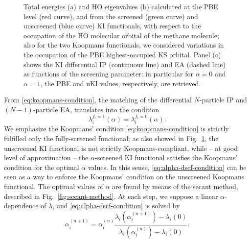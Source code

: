 \begin{figure}
    \centering
    \usebox{\measurebox}
    \begin{minipage}{.48\linewidth}
        \vfill
    \end{minipage}
    \caption[Total energy and $\varepsilon_{\rm HO}$ vs. $f_{\rm HO}$ for $CH_4$ molecule]{Total energies (a) and HO eigenvalues (b) calculated at the PBE level (red curve), and from the screened (green curve) and unscreened (blue curve) KI functionals, with respect to the occupation of the HO molecular orbital of the methane molecule; also for the two Koopmans functionals, we considered variations in the occupation of the PBE highest-occupied KS orbital. Panel (c) shows the KI differential IP (continuous line) and EA (dashed line) as functions of the screening parameter: in particular for $\alpha=0$ and $\alpha=1$, the PBE and uKI values, respectively, are retrieved.}
    \label{fig:pwl-ki-dft}
\end{figure}

From \cref{eq:koopmans-condition}, the matching of the differential $N$-particle IP and $(N-1)$-particle EA, translates into the condition
%
\begin{equation}
    \lambda_i^{f_i=1}(\alpha) = \lambda_i^{f_i=0}(\alpha) .
    \label{eq:alpha-dscf-condition}
\end{equation}
%
We emphasize the Koopmans' condition \eqref{eq:koopmans-condition} is strictly fulfilled only the fully-screened functional; as also showed in Fig.~\ref{fig:pwl-ki-dft}, the unscreened KI functional is not strictly Koopmans-compliant, while -- at good level of approximation -- the $\alpha$-screened KI functional satisfies the Koopmans' condition for the optimal $\alpha$ values. In this sense, \cref{eq:alpha-dscf-condition} can be seen as a way to enforce the Koopmans' condition on the unscreened Koopmans functional. The optimal values of $\alpha$ are found by means of the secant method, described in Fig.~\ref{fig:secant-method}. At each step, we suppose a linear $\alpha$-dependence of $\lambda_i$ and \cref{eq:alpha-dscf-condition} is solved by
%
\begin{equation}
    \alpha_i^{(n+1)} = \alpha_i^{(n)} \frac{\lambda_i(\alpha_i^{(n+1)}) - \lambda_i(0)}{\lambda_i(\alpha_i^{(n)}) - \lambda_i(0)} .
    \label{eq:alpha-intermediate-expression}
\end{equation}

